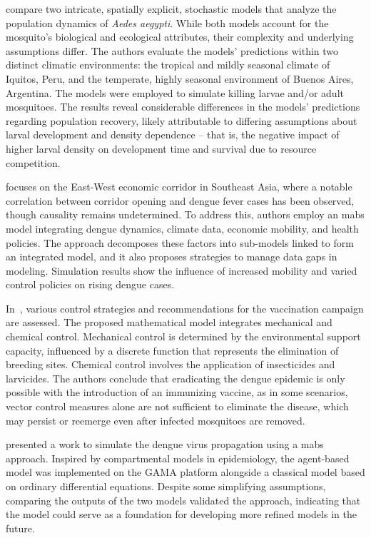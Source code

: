 \cite{Legros2016} compare two intricate, spatially explicit, stochastic models
that analyze the population dynamics of \textit{Aedes aegypti}. While both
models account for the mosquito's biological and ecological attributes, their
complexity and underlying assumptions differ. The authors evaluate the models’
predictions within two distinct climatic environments: the tropical and mildly
seasonal climate of Iquitos, Peru, and the temperate, highly seasonal
environment of Buenos Aires, Argentina. The models were employed to simulate
killing larvae and/or adult mosquitoes. The results reveal considerable
differences in the models' predictions regarding population recovery, likely
attributable to differing assumptions about larval development and density
dependence -- that is, the negative impact of higher larval density on
development time and survival due to resource competition.

\cite{damien:2017} focuses on the East-West economic corridor in Southeast
Asia, where a notable correlation between corridor opening and dengue fever
cases has been observed, though causality remains undetermined. To address this,
authors employ an \gls{mabs} model integrating dengue dynamics, climate data,
economic mobility, and health policies. The approach decomposes these factors
into sub-models linked to form an integrated model, and it also proposes
strategies to manage data gaps in modeling. Simulation results show the
influence of increased mobility and varied control policies on rising dengue
cases.

In~\cite{Carvalho2019}, various control strategies and recommendations for the
vaccination campaign are assessed. The proposed mathematical model integrates
mechanical and chemical control. Mechanical control is determined by the
environmental support capacity, influenced by a discrete function that
represents the elimination of breeding sites. Chemical control involves the
application of insecticides and larvicides. The authors conclude that
eradicating the dengue epidemic is only possible with the introduction of an
immunizing vaccine, as in some scenarios, vector control measures alone are not
sufficient to eliminate the disease, which may persist or reemerge even after
infected mosquitoes are removed.


\cite{da-silva:2020} presented a work to simulate the dengue virus propagation
using a \gls{mabs} approach. Inspired by compartmental models in epidemiology,
the agent-based model was implemented on the GAMA platform alongside a classical
model based on ordinary differential equations. Despite some simplifying
assumptions, comparing the outputs of the two models validated the approach,
indicating that the model could serve as a foundation for developing more
refined models in the future.

